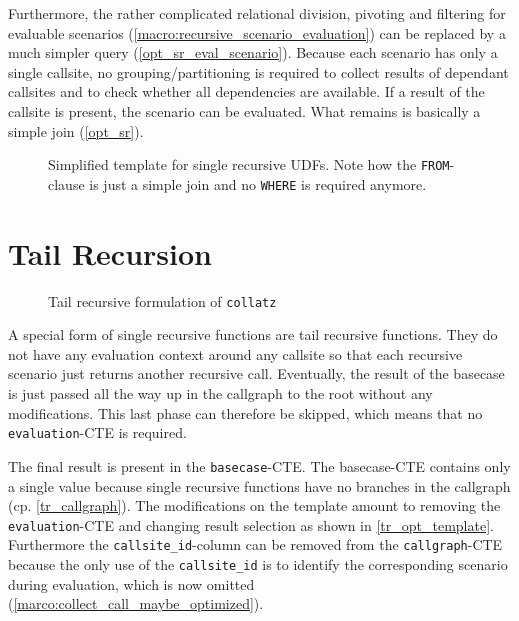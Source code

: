 Furthermore, the rather complicated relational division, pivoting and filtering for evaluable scenarios (\autoref{macro:recursive_scenario_evaluation}) can be replaced by a much simpler query (\autoref{opt_sr_eval_scenario}). Because each scenario has only a single callsite, no grouping/partitioning is required to collect results of dependant callsites and to check whether all dependencies are available. If a result of the callsite is present, the scenario can be evaluated. What remains is basically a simple join (\autoref{opt_sr}).

\begin{figure}[h!]
    \centering
    \caption{Simplified template for single recursive UDFs. Note how the \texttt{FROM}-clause is just a simple join and no \texttt{WHERE} is required anymore.}
    \label{opt_sr_eval_scenario}
\end{figure}



\section{Tail Recursion}

\begin{wrapfigure}{r}{0.5\textwidth}
  \vspace{-10pt}
  \caption{Tail recursive formulation of \texttt{collatz}}
  \label{lst:fib_tr}
\end{wrapfigure}

A special form of single recursive functions are tail recursive functions. They do not have any evaluation context around any callsite so that each recursive scenario just returns another recursive call. Eventually, the result of the basecase is just passed all the way up in the callgraph to the root without any modifications. This last phase can therefore be skipped, which means that no \texttt{evaluation}-CTE is required.

The final result is present in the \texttt{basecase}-CTE. The basecase-CTE contains only a single value because single recursive functions have no branches in the callgraph (cp. \autoref{tr_callgraph}). The modifications on the template amount to removing the \texttt{evaluation}-CTE and changing result selection as shown in \autoref{tr_opt_template}. Furthermore the \texttt{callsite\_id}-column can be removed from the \texttt{callgraph}-CTE because the only use of the \texttt{callsite\_id} is to identify the corresponding scenario during evaluation, which is now omitted (\autoref{marco:collect_call_maybe_optimized}).

